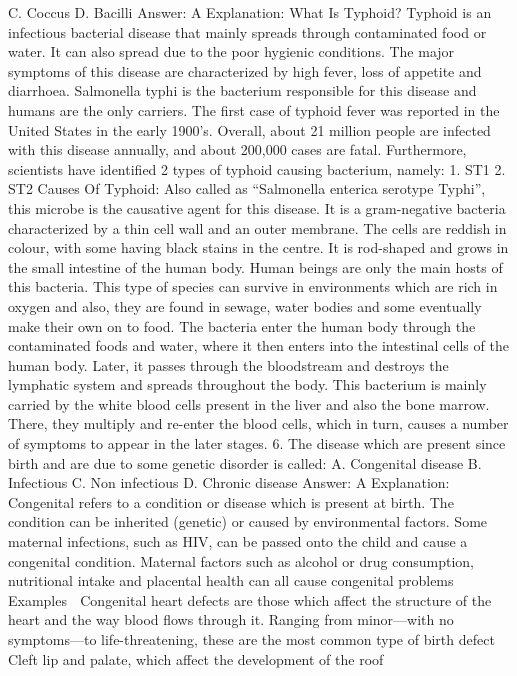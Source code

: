 C. Coccus
D. Bacilli
Answer: A
Explanation:
What Is Typhoid?
Typhoid is an infectious bacterial disease that mainly spreads
through contaminated food or water. It can also spread due to the
poor hygienic conditions. The major symptoms of this disease are
characterized by high fever, loss of appetite and
diarrhoea. Salmonella typhi is the bacterium responsible for this
disease and humans are the only carriers. The first case of typhoid
fever was reported in the United States in the early 1900’s. Overall,
about 21 million people are infected with this disease annually, and
about 200,000 cases are fatal. Furthermore, scientists have
identified 2 types of typhoid causing bacterium, namely:
1. ST1
2. ST2
Causes Of Typhoid:
Also called as “Salmonella enterica serotype Typhi”, this microbe is
the causative agent for this disease. It is a gram-negative bacteria
characterized by a thin cell wall and an outer membrane. The cells
are reddish in colour, with some having black stains in the centre.
It is rod-shaped and grows in the small intestine of the human body.
Human beings are only the main hosts of this bacteria. This type of
species can survive in environments which are rich in oxygen and
also, they are found in sewage, water bodies and some eventually
make their own on to food.
The bacteria enter the human body through the contaminated foods
and water, where it then enters into the intestinal cells of the
human body. Later, it passes through the bloodstream and destroys
the lymphatic system and spreads throughout the body. This
bacterium is mainly carried by the white blood cells present in the
liver and also the bone marrow. There, they multiply and re-enter
the blood cells, which in turn, causes a number of symptoms to
appear in the later stages.
6. The disease which are present since birth and are due to
some genetic disorder is called:
A. Congenital disease
B. Infectious
C. Non infectious
D. Chronic disease
Answer: A
Explanation: Congenital refers to a condition or disease which is
present at birth. The condition can be inherited (genetic) or caused
by environmental factors.
Some maternal infections, such as HIV, can be passed onto the child
and cause a congenital condition. Maternal factors such as alcohol or
drug consumption, nutritional intake and placental health can all
cause congenital problems
Examples
 Congenital heart defects are those which affect the structure
of the heart and the way blood flows through it. Ranging from
minor—with no symptoms—to life-threatening, these are the
most common type of birth defect
 Cleft lip and palate, which affect the development of the roof
